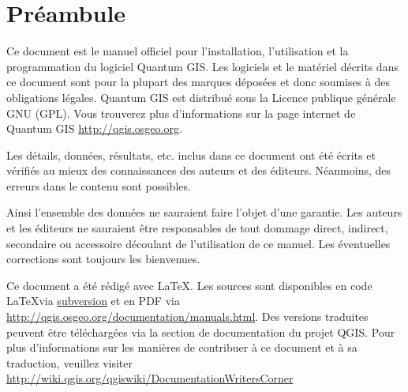 \newcommand\qgistip[1]{\raggedright\small{#1}}
\renewcommand{\topfraction}{0.85}
\renewcommand{\textfraction}{0.1}
\renewcommand{\floatpagefraction}{0.75}

\thispagestyle{empty}


\section*{Pr\'eambule}


\vspace{1cm}


Ce document est le manuel officiel pour l'installation, l'utilisation et la programmation du logiciel Quantum GIS. Les logiciels et le mat\'eriel d\'ecrits dans ce document sont pour la plupart des marques d\'epos\'ees et donc soumises \`a des obligations l\'egales. Quantum GIS est distribu\'e sous la Licence publique g\'en\'erale GNU (GPL). Vous trouverez plus d'informations sur la page internet de Quantum GIS \url{http://qgis.osgeo.org}.

Les d\'etails, donn\'ees, r\'esultats, etc. inclus dans ce document ont \'et\'e \'ecrits et v\'erifi\'es au mieux des connaissances des auteurs et des \'editeurs. N\'eanmoins, des erreurs dans le contenu sont possibles.

Ainsi l'ensemble des donn\'ees ne sauraient faire l'objet d'une garantie. Les auteurs et les \'editeurs ne sauraient \^etre responsables de tout dommage direct, indirect, secondaire ou accessoire d\'ecoulant de l'utilisation de ce manuel. Les \'eventuelles corrections sont toujours les bienvenues.

Ce document a \'et\'e r\'edig\'e avec \LaTeX. Les sources sont disponibles en code \LaTeX via \href{http://wiki.qgis.org/qgiswiki/DocumentationWritersCorner}{subversion} et en PDF via \url{http://qgis.osgeo.org/documentation/manuals.html}. 
Des versions traduites peuvent \^etre t\'el\'echarg\'ees via la section de documentation du projet QGIS. Pour plus d'informations sur les mani\`eres de contribuer \`a ce document et \`a sa traduction, veuillez visiter \url{http://wiki.qgis.org/qgiswiki/DocumentationWritersCorner} 

